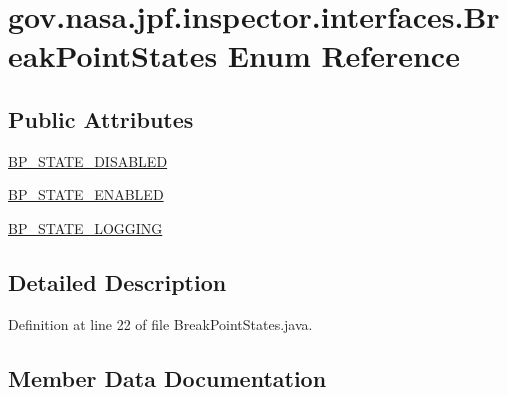 \hypertarget{enumgov_1_1nasa_1_1jpf_1_1inspector_1_1interfaces_1_1_break_point_states}{}\section{gov.\+nasa.\+jpf.\+inspector.\+interfaces.\+Break\+Point\+States Enum Reference}
\label{enumgov_1_1nasa_1_1jpf_1_1inspector_1_1interfaces_1_1_break_point_states}
\subsection*{Public Attributes}
\begin{DoxyCompactItemize}
\item 
\hyperlink{enumgov_1_1nasa_1_1jpf_1_1inspector_1_1interfaces_1_1_break_point_states_a3ae6a736b3f7eeb695b11fccaab73fa2}{B\+P\+\_\+\+S\+T\+A\+T\+E\+\_\+\+D\+I\+S\+A\+B\+L\+ED}
\item 
\hyperlink{enumgov_1_1nasa_1_1jpf_1_1inspector_1_1interfaces_1_1_break_point_states_a5d9fa5a184b9ce97df2f84151f78116d}{B\+P\+\_\+\+S\+T\+A\+T\+E\+\_\+\+E\+N\+A\+B\+L\+ED}
\item 
\hyperlink{enumgov_1_1nasa_1_1jpf_1_1inspector_1_1interfaces_1_1_break_point_states_ae881aa2d81965de8cca2c1d2fac0b504}{B\+P\+\_\+\+S\+T\+A\+T\+E\+\_\+\+L\+O\+G\+G\+I\+NG}
\end{DoxyCompactItemize}


\subsection{Detailed Description}


Definition at line 22 of file Break\+Point\+States.\+java.



\subsection{Member Data Documentation}
